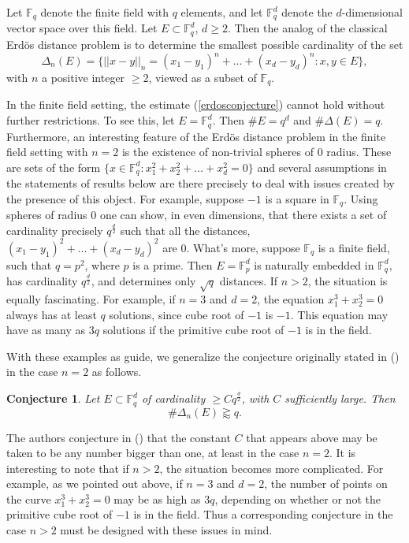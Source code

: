 \documentclass[11pt]{article}
\numberwithin{equation}{section}
\theoremstyle{plain}
\newtheorem{conjecture}[theorem]{Conjecture}
\theoremstyle{definition}
\theoremstyle{remark}
\begin{document}
Let ${\mathbb F}_q$ denote the finite field with $q$ elements, and let ${\mathbb F}^d_q$ denote the 
$d$-dimensional vector space over this field. Let $E \subset {\mathbb F}_q^d$, $d \ge 2$. Then the  
analog of the classical Erd\"os distance problem is to determine the  
smallest possible cardinality of the set
$$ \Delta_n(E)=\{{||x-y||_n=(x_1-y_1)}^n+\dots+{(x_d-y_d)}^n: x,y \in E 
\}, $$ with $n$ a positive integer
$\ge 2$, viewed as a subset of ${\mathbb F}_q$.

In the finite field setting, the estimate (\ref{erdosconjecture})  
cannot hold without further restrictions.
To see this, let $E={\mathbb F}^d_q$. Then $\# E=q^d$ and $\# \Delta 
(E)=q$. Furthermore, an interesting feature of the Erd\"os distance  
problem in the finite field setting with $n=2$ is the existence of  
non-trivial spheres of $0$ radius. These are sets of the form $\{x  
\in {\mathbb F}_q^d: x_1^2+x_2^2+\dots+x_d^2=0\}$ and several  
assumptions in the statements of results below are there precisely to  
deal with issues created by the presence of this object. For example,  
suppose $-1$ is a square in ${\mathbb F}_q$. Using spheres of radius  
$0$ one can show, in even dimensions, that there exists a set of  
cardinality precisely $q^{\frac{d}{2}}$ such that all the distances, $ 
{(x_1-y_1)}^2+\dots+{(x_d-y_d)}^2$ are $0$. What's more, suppose $ 
{\mathbb F}_q$ is a finite field, such that $q=p^2$, where $p$ is a  
prime. Then $E={\mathbb F}_p^d$ is naturally embedded in ${\mathbb F} 
_q^d,$ has cardinality $q^{\frac{d}{2}}$, and determines only $\sqrt 
{q}$ distances. If $n>2$, the situation is equally fascinating. For  
example, if $n=3$ and $d=2$, the equation $x_1^3+x_2^3=0$ always has  
at least $q$ solutions, since cube root of $-1$ is $-1$. This  
equation may have as many as $3q$ solutions if the primitive cube  
root of $-1$ is in the field.

With these examples as guide, we generalize the conjecture originally  
stated in (\cite{IR06}) in the case $n=2$ as follows.

\begin{conjecture} \label{conjecture} Let $E \subset {\mathbb F}^d_q$  
of cardinality $\ge  Cq^{\frac{d}{2}}$, with $C$ sufficiently large.  
Then
$$ \# \Delta_n(E) \gtrapprox q. $$ \end{conjecture}

The authors conjecture in (\cite{IR06}) that the constant $C$ that   appears above may be taken to be any number bigger than one, at least in the case $n=2$. It is   interesting to note that if $n>2$, the situation becomes more   complicated. For example, as we pointed out above, if $n=3$ and $d=2 $, the number of points on the curve $x_1^3+x_2^3=0$ may be as high as $3q$, depending on whether or not the primitive cube root of $-1$  is in the field. Thus a corresponding conjecture in the case $n>2$  
must be designed with these issues in mind.
\end{document}

